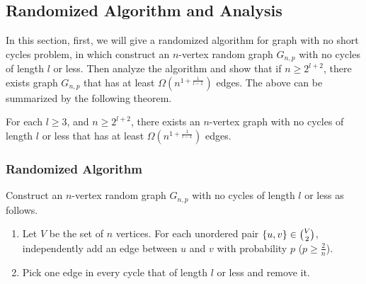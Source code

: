 \subsection {Randomized Algorithm and Analysis}\label{RA}
In this section, first, we will give a randomized algorithm for graph with no short cycles problem, in which construct an $n$-vertex random graph $G_{n,p}$ with no cycles of length $l$ or less. Then analyze the algorithm and show that if $n\ge 2^{l+2}$, there exists graph $G_{n,p}$ that has at least $\Omega (n^{1+\frac{1}{l-1}})$ edges. The above can be summarized by the following theorem.
\begin{theorem}
For each $l\ge 3$, and $n\ge 2^{l+2}$, there exists an $n$-vertex graph with no cycles of length $l$ or less that has at least $\Omega (n^{1+\frac{1}{l-1}})$ edges.
\end{theorem}
\subsubsection{Randomized Algorithm}
Construct an $n$-vertex random graph $G_{n,p}$ with no cycles of length $l$ or less as follows. 
\begin{enumerate}
    \item Let $V$ be the set of $n$ vertices. For each unordered pair $\{u,v\}\in \tbinom{V}{2}$, independently add an edge between $u$ and $v$ with probability $p$ ($p\ge \frac{2}{n}$).
    \item Pick one edge in every cycle that of length $l$ or less and remove it.
\end{enumerate}


